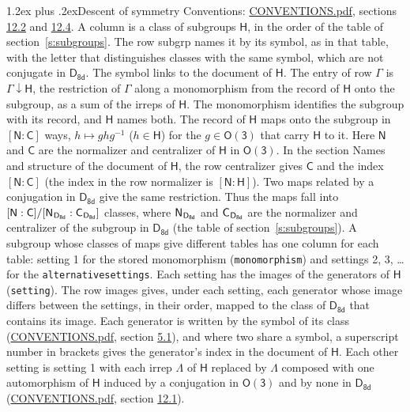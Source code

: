 \documentclass[10pt,a4paper]{article}
\makeatletter
\renewcommand\section{\@startsection{section}{1}{\z@}{-3ex plus -1ex minus -.2ex}%
  {1.2ex plus .2ex}{\normalfont\large\sffamily\bfseries\color{parttitle}}}
\numberwithin{equation}{section}
\newcommand{\grp}[1]{\mathsf{#1}}
\newcommand{\grpindex}[2]{[#1 : #2]}
\newcommand{\restr}[2]{#1\!\downarrow#2}
\newcommand{\hairsp}{\mkern1mu}
\makeatother
\begin{document}
\section{Descent of symmetry}\label{s:subduction}
Conventions: \href{../../CONVENTIONS.pdf}{CONVENTIONS.pdf}, sections \href{../../CONVENTIONS.pdf\#conv.12.2}{12.2} and \href{../../CONVENTIONS.pdf\#conv.12.4}{12.4}.
A column is a class of subgroups $\grp{H}$, in the order of the table of section~\ref{s:subgroups}. The row subgrp names it by its symbol, as in that table, with the letter that distinguishes classes with the same symbol, which are not conjugate in $\grp{D_{8d}}$. The symbol links to the document of $\grp{H}$. The entry of row $\Gamma$ is $\restr{\Gamma}{\grp{H}}$, the restriction of $\Gamma$ along a monomorphism from the record of $\grp{H}$ onto the subgroup, as a sum of the irreps of $\grp{H}$. The monomorphism identifies the subgroup with its record, and $\grp{H}$ names both. \label{n:group.normalizer.o3}\label{n:group.centralizer.o3}The record of $\grp{H}$ maps onto the subgroup in $\grpindex{\grp{N}}{\grp{C}}$ ways, $h \mapsto g h g^{-1}$ ($h \in \grp{H}$) for the $g \in \grp{O(3)}$ that carry $\grp{H}$ to it. Here $\grp{N}$ and $\grp{C}$ are the normalizer and centralizer of $\grp{H}$ in \href{O3.pdf}{$\grp{O(3)}$}. In the section Names and structure of the document of $\grp{H}$, the row centralizer gives $\grp{C}$ and the index $\grpindex{\grp{N}}{\grp{C}}$ (the index in the row normalizer is $\grpindex{\grp{N}}{\grp{H}}$). Two maps related by a conjugation in $\grp{D_{8d}}$ give the same restriction. Thus the maps fall into $\grpindex{\grp{N}}{\grp{C}}/\grpindex{\grp{N}_{\hairsp \grp{D_{8d}}}}{\grp{C}_{\hairsp \grp{D_{8d}}}}$ classes, where $\grp{N}_{\hairsp \grp{D_{8d}}}$ and $\grp{C}_{\hairsp \grp{D_{8d}}}$ are the normalizer and centralizer of the subgroup in $\grp{D_{8d}}$ (the table of section~\ref{s:subgroups}). \label{n:head.setting}A subgroup whose classes of maps give different tables has one column for each table: setting 1 for the stored monomorphism (\texttt{monomorphism}) and settings 2, 3, \dots{} for the \texttt{alternativesettings}. Each setting has the images of the generators of $\grp{H}$ (\texttt{setting}). \label{n:head.images}The row images gives, under each setting, each generator whose image differs between the settings, in their order, mapped to the class of $\grp{D_{8d}}$ that contains its image. \label{n:element.generator.index}Each generator is written by the symbol of its class (\href{../../CONVENTIONS.pdf}{CONVENTIONS.pdf}, section \href{../../CONVENTIONS.pdf\#conv.5.1}{5.1}), and where two share a symbol, a superscript number in brackets gives the generator's index in the document of $\grp{H}$. \label{n:irrep.Delta}Each other setting is setting 1 with each irrep $\Lambda$ of $\grp{H}$ replaced by $\Lambda$ composed with one automorphism of $\grp{H}$ induced by a conjugation in \href{O3.pdf}{$\grp{O(3)}$} and by none in $\grp{D_{8d}}$ (\href{../../CONVENTIONS.pdf}{CONVENTIONS.pdf}, section \href{../../CONVENTIONS.pdf\#conv.12.1}{12.1}).
\end{document}
